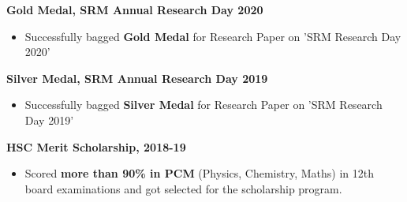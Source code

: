 \documentclass[10pt,a4paper,ragged2e]{altacv}
\begin{document}
\smallskip
\large{\textbf{Gold Medal, SRM Annual Research Day 2020}}
\begin{itemize}
\item[\faTrophy]\begin{comment} Participated in 'SRM Research Day 2019', held on 28th February 2020 held by SRM IST and \end{comment}
Successfully bagged \textbf{Gold Medal} for Research Paper on 'SRM Research Day 2020'
\end{itemize}
\smallskip
\large{\textbf{Silver Medal, SRM Annual Research Day 2019}}
\begin{itemize}
\item[\faTrophy]\begin{comment} Participated in 'SRM Research Day 2019', held on 26th February 2019 held by SRM IST and \end{comment}
Successfully bagged \textbf{Silver Medal} for Research Paper on 'SRM Research Day 2019'
\end{itemize}
\smallskip
\large{\textbf{HSC Merit Scholarship, 2018-19}}
\begin{itemize}
\item[\faTrophy] Scored \textbf{more than 90\% in PCM} (Physics, Chemistry, Maths) in 12th board examinations and got selected for the scholarship program.\begin{comment} by SRM wherein the students are given concessions on the college tution fees.\end{comment}
\end{itemize}
\smallskip
\begin{comment}
\large{\textbf{National Cyber Olympiad 2018}}
\begin{itemize}
\item[\faTrophy]Secured a \textbf{world rank of 71} in NCO 2018. 
\end{itemize}
\end{comment}
\begin{comment}
Got selected for the Round 2 in NSO after clearing Problem Solving and Science Questionnaire stage, held by Science Olympiad Foundation.\\
\end{comment}
\smallskip

\begin{comment}
\cvsection{SKILLS}

\cvskill{C, C++, Windows}{5}
\divider

\cvskill{Java, \LaTeX, Linux, Word}{4}
\divider

\cvskillf{HTML, JavaScript, Mac OS,\\ PowerPoint, Excel, Photoshop}{3}
\end{comment}
\end{document}
